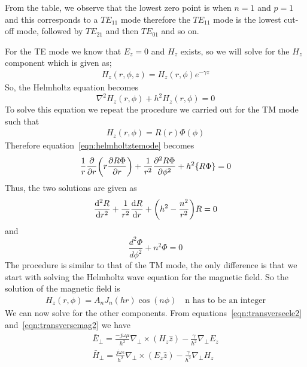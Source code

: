 From the table, we observe that the lowest zero point is when $n = 1$ and $p = 1$ and this corresponds to a $TE_{11}$ mode therefore the $TE_{11}$ mode is the lowest cut-off mode, followed by $TE_{21}$ and then $TE_{01}$ and so on.

For the TE mode we know that $E_z = 0$ and $H_z$ exists, so we will solve for the $H_z$  component which is given as;
\begin{align*}
H_z(r,\phi,z) = H_z(r,\phi)e^{-\gamma z}
\end{align*}
So, the Helmholtz equation becomes
\begin{equation}
\nabla^2 H_z(r,\phi) + h^2 H_z(r,\phi) = 0
\label{eqn:helmholtztemode}
\end{equation}
To solve this equation we repeat the procedure we carried out for the TM mode such that 
\begin{align*}
H_z(r,\phi)= R(r)\Phi(\phi)
\end{align*}
Therefore equation~\eqref{eqn:helmholtztemode} becomes
\begin{align*}
\frac{1}{r}\partialderivative{}{r}\bigg(r\partialderivative{R\Phi}{r}\bigg) + \frac{1}{r^2}\partialderivative[2]{R\Phi}{\phi} + h^2\{R\Phi\} = 0
\end{align*}
Thus, the two solutions are given as
\begin{equation}
\derivative[2]{R}{r} + \frac{1}{r^2}\derivative{R}{r} + \bigg(h^2 - \frac{n^2}{r^2}\bigg)R = 0
\label{eqn:radialtemode}
\end{equation}
and 
\begin{equation}
\dfrac{d^2\Phi}{d\phi^2} + n^2\Phi = 0
\label{eqn:angulartemode}
\end{equation}
The procedure is similar to that of the TM mode, the only difference is that we start with solving the Helmholtz wave equation for the magnetic field. So the solution of the magnetic field is 
\begin{align*}
H_z(r,\phi) = A_nJ_n(hr)\cos(n\phi)\quad\text{n has to be an integer}
\end{align*}
We can now solve for the other components. From equations~\eqref{eqn:transverseele2} and~\eqref{eqn:transversemag2} we have
\begin{align*}
\bar{E}_\perp = \frac{-j\omega\mu}{h^2}\nabla_\perp\times(H_z\hat{z}) - \frac{\gamma}{h^2}\nabla_\perp E_z\\
\bar{H}_\perp = \frac{j\omega\epsilon}{h^2}\nabla_\perp\times(E_z\hat{z}) - \frac{\gamma}{h^2}\nabla_\perp H_z
\end{align*}

